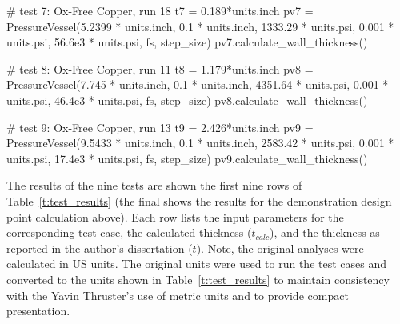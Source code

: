 \documentclass{article}
\begin{document}
\begin{sagesilent}
# test 7: Ox-Free Copper, run 18
t7 = 0.189*units.inch
pv7 = PressureVessel(5.2399 * units.inch,
                     0.1 * units.inch,
                     1333.29 * units.psi,
                     0.001 * units.psi,
                     56.6e3 * units.psi,
                     fs,
                     step_size)
pv7.calculate_wall_thickness()

# test 8: Ox-Free Copper, run 11
t8 = 1.179*units.inch
pv8 = PressureVessel(7.745 * units.inch,
                     0.1 * units.inch,
                     4351.64 * units.psi,
                     0.001 * units.psi,
                     46.4e3 * units.psi,
                     fs,
                     step_size)
pv8.calculate_wall_thickness()

# test 9: Ox-Free Copper, run 13
t9 = 2.426*units.inch
pv9 = PressureVessel(9.5433 * units.inch,
                     0.1 * units.inch,
                     2583.42 * units.psi,
                     0.001 * units.psi,
                     17.4e3 * units.psi,
                     fs,
                     step_size)
pv9.calculate_wall_thickness()
\end{sagesilent}

The results of the nine tests are shown the first nine rows of Table~\ref{t:test_results} (the final shows the results for the demonstration design point calculation above).  Each row lists the input parameters for the corresponding test case, the calculated thickness ($t_{calc}$), and the thickness as reported in the author's dissertation ($t$).  Note, the original analyses were calculated in US units.  The original units were used to run the test cases and converted to the units shown in Table~\ref{t:test_results}  to maintain consistency with the Yavin Thruster's use of metric units and to provide compact presentation.  
\end{document}
